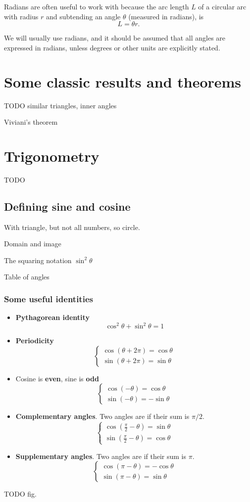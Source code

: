 Radians are often useful to work with because the arc length $L$ of a circular arc with radius $r$ and subtending an angle $\theta$ (measured in radians), is
\[ L = \theta r.\] 

We will usually use radians, and it should be assumed that all angles are expressed in radians, unless degrees or other units are explicitly stated.

\section{Some classic results and theorems}
TODO similar triangles, inner angles

Viviani's theorem

\section{Trigonometry}
TODO
\subsection{Defining sine and cosine}
With triangle, but not all numbers, so circle.

Domain and image

The squaring notation $\sin^2\theta$

Table of angles

\subsubsection{Some useful identities}
\begin{itemize}
\item \textbf{Pythagorean identity}
\[ \cos^2 \theta + \sin^2\theta = 1 \]
\item \textbf{Periodicity}
\[ \begin{cases}
\cos(\theta + 2\pi) = \cos\theta \\
\sin(\theta + 2\pi) = \sin\theta
\end{cases} \]
\item Cosine is \textbf{even}, sine is \textbf{odd}
\[ \begin{cases}
\cos(-\theta) = \cos\theta \\
\sin(-\theta) = -\sin\theta
\end{cases} \]
\item \textbf{Complementary angles}. Two angles are  if their sum is $\pi/2$.
\[ \begin{cases}
\cos \left(\frac{\pi}{2} - \theta\right) = \sin\theta \\
\sin \left(\frac{\pi}{2} - \theta\right) = \cos\theta
\end{cases} \]
\item \textbf{Supplementary angles}. Two angles are  if their sum is $\pi$.
\[ \begin{cases}
\cos \left(\pi - \theta\right) = -\cos\theta \\
\sin \left(\pi - \theta\right) = \sin\theta
\end{cases} \]
\end{itemize}
TODO fig.
